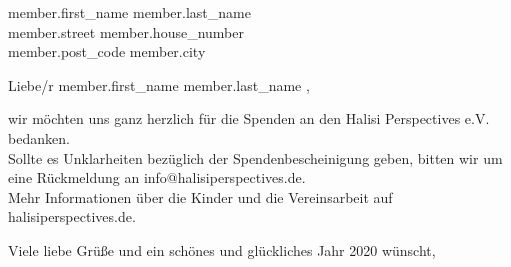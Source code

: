 \documentclass[
               DIV=15,
               fontsize=10pt,
               parskip=half,
               enlargefirstpage=true,
               fromalign=right,
               fromrule=afteraddress,
               fromlogo,
              ]{scrlttr2}
\begin{document}
\begin{letter}{ {{ member.first_name }} {{ member.last_name }} \\
                {{ member.street }} {{ member.house_number }} \\
                {{ member.post_code }} {{ member.city }} }

\opening{Liebe/r {{ member.first_name }} {{ member.last_name }},}
wir möchten uns ganz herzlich für die Spenden an den Halisi Perspectives e.V. bedanken.\\

Sollte es Unklarheiten bezüglich der Spendenbescheinigung geben, bitten wir um eine Rückmeldung an info@halisiperspectives.de.\\

Mehr Informationen über die Kinder und die Vereinsarbeit auf halisiperspectives.de.\\

\closing{Viele liebe Grüße und ein schönes und glückliches Jahr 2020 wünscht,}

\end{letter}
\end{document}
